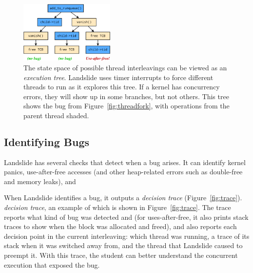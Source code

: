 \begin{figure}[t]
	\centering
\includegraphics[width=0.42\textwidth]{threadfork/threadfork.pdf}
\caption{The state space of possible thread interleavings can be viewed as an {\em execution tree}.
Landslide uses timer interrupts to force different threads to run as it explores this tree.
If a kernel has concurrency errors, they will show up in some branches, but not others.
This tree shows the bug from Figure~\ref{fig:threadfork}, with operations from the parent thread shaded.
}
\label{fig:tree}
\end{figure}

\subsection{Identifying Bugs}

Landslide has several checks that detect when a bug arises. It can identify kernel panics, use-after-free accesses (and other heap-related errors such as double-free and memory leaks), and

When Landslide identifies a bug, it outputs a
\shortversion
{{\em decision trace} (Figure~\ref{fig:trace}).}
{{\em decision trace}, an example of which is shown in Figure~\ref{fig:trace}.}
The trace reports what kind of bug was detected
\shortversion
{and}
{(for uses-after-free, it also prints stack traces to show when the block was allocated and freed), and}
also reports each decision point in the current interleaving: which thread was running, a trace of its stack when it was switched away from, and the thread that Landslide caused to preempt it.
With this trace, the student can better understand the concurrent execution that exposed the bug.

